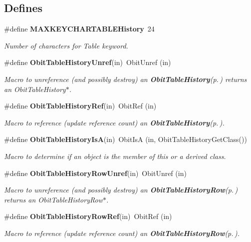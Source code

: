 \subsection*{Defines}
\begin{CompactItemize}
\item 
\#define {\bf MAXKEYCHARTABLEHistory}\ 24
\begin{CompactList}\small\item\em Number of characters for Table keyword. \item\end{CompactList}\item 
\#define {\bf Obit\-Table\-History\-Unref}(in)\ Obit\-Unref (in)
\begin{CompactList}\small\item\em Macro to unreference (and possibly destroy) an {\bf Obit\-Table\-History}{\rm (p.\,\pageref{structObitTableHistory})} returns an Obit\-Table\-History$\ast$. \item\end{CompactList}\item 
\#define {\bf Obit\-Table\-History\-Ref}(in)\ Obit\-Ref (in)
\begin{CompactList}\small\item\em Macro to reference (update reference count) an {\bf Obit\-Table\-History}{\rm (p.\,\pageref{structObitTableHistory})}. \item\end{CompactList}\item 
\#define {\bf Obit\-Table\-History\-Is\-A}(in)\ Obit\-Is\-A (in, Obit\-Table\-History\-Get\-Class())
\begin{CompactList}\small\item\em Macro to determine if an object is the member of this or a derived class. \item\end{CompactList}\item 
\#define {\bf Obit\-Table\-History\-Row\-Unref}(in)\ Obit\-Unref (in)
\begin{CompactList}\small\item\em Macro to unreference (and possibly destroy) an {\bf Obit\-Table\-History\-Row}{\rm (p.\,\pageref{structObitTableHistoryRow})} returns an Obit\-Table\-History\-Row$\ast$. \item\end{CompactList}\item 
\#define {\bf Obit\-Table\-History\-Row\-Ref}(in)\ Obit\-Ref (in)
\begin{CompactList}\small\item\em Macro to reference (update reference count) an {\bf Obit\-Table\-History\-Row}{\rm (p.\,\pageref{structObitTableHistoryRow})}. \item\end{CompactList}\item 

\end{CompactItemize}
